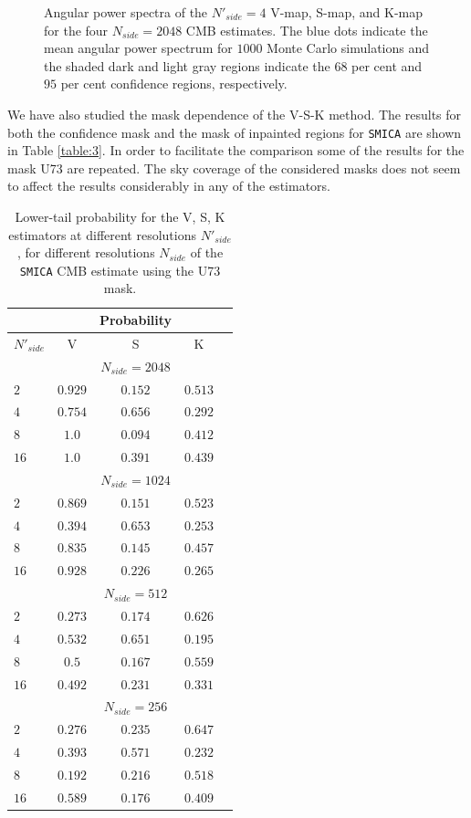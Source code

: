 \begin{figure}
\caption{Angular power spectra of the $N'_{side} = 4$ V-map, S-map, and K-map for the four $N_{side} = 2048$ CMB estimates. The blue dots indicate the mean angular power spectrum for $1000$ Monte Carlo simulations and the shaded dark and light gray regions indicate the $68$ per cent and $95$ per cent confidence regions, respectively.}
\label{Fig:4}
\end{figure}

We have also studied the mask dependence of the V-S-K method. The results for both the confidence mask and the mask of inpainted regions for \texttt{SMICA} are shown in Table \ref{table:3}. In order to facilitate the comparison some of the results for the mask U73 are repeated. The sky coverage of the considered masks does not seem to affect the results considerably in any of the estimators. 

\begin{table}
\centering
\caption{Lower-tail probability for the V, S, K estimators at different resolutions $N'_{side}$, for different resolutions $N_{side}$ of the  \texttt{SMICA} CMB estimate using the U73 mask.}
\label{table:2}
\begin{tabular}{@{}lcccc}
\hline 
  & & Probability & \\
\hline  
$N'_{side}$ & V & S & K \\ 
\hline  
 & & $N_{side}=2048$ & \\
$2$ & $0.929 $ & $ 0.152$ & $0.513 $ \\ 
$4$ & $ 0.754$ & $0.656 $ & $0.292 $  \\
$8$ & $ 1.0$ & $ 0.094 $ & $ 0.412 $  \\
$16$ & $ 1.0 $ & $ 0.391 $ & $ 0.439 $  \\
 & & $ N_{side} = 1024 $ & \\
$2$ & $ 0.869 $ & $ 0.151 $ & $ 0.523 $ \\ 
$4$ & $ 0.394 $ & $ 0.653 $ & $ 0.253 $  \\
$8$ & $ 0.835 $ & $ 0.145 $ & $ 0.457 $  \\
$16$ & $ 0.928 $ & $ 0.226 $ & $ 0.265 $  \\
 & & $N_{side} = 512$ & \\
$2$ & $0.273 $ & $ 0.174 $ & $ 0.626 $ \\ 
$4$ & $ 0.532 $ & $ 0.651 $ & $ 0.195 $  \\
$8$ & $ 0.5 $ & $ 0.167 $ & $ 0.559 $  \\
$16$ & $ 0.492 $ & $ 0.231 $ & $ 0.331 $  \\
 & & $N_{side} = 256$ & \\
$2$ & $ 0.276 $ & $ 0.235 $ & $ 0.647 $ \\ 
$4$ & $ 0.393 $ & $ 0.571 $ & $ 0.232 $  \\
$8$ & $ 0.192 $ & $ 0.216 $ & $ 0.518 $  \\
$16$ & $ 0.589$ & $ 0.176 $ & $ 0.409 $  \\
\end{tabular} 
\end{table}

